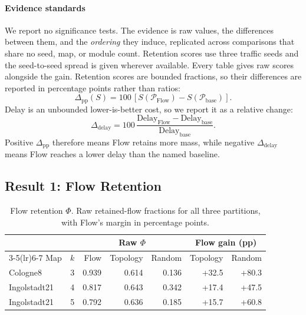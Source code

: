 \documentclass[journal]{IEEEtran}
\theoremstyle{definition}
\begin{document}
\paragraph{Evidence standards}
We report no significance tests. The evidence is raw values, the differences between them, and the \emph{ordering} they induce, replicated across comparisons that share no seed, map, or module count. Retention scores use three traffic seeds and the seed-to-seed spread is given wherever available. Every table gives raw scores alongside the gain. Retention scores are bounded fractions, so their differences are reported in percentage points rather than ratios:
\begin{equation}
    \Delta_{\mathrm{pp}}(S)
    =
    100\,[S(\mathcal{P}_{\mathrm{Flow}})
        -S(\mathcal{P}_{\mathrm{base}})] .
    \label{eq:gainpp}
\end{equation}
Delay is an unbounded lower-is-better cost, so we report it as a relative change:
\begin{equation}
    \Delta_{\mathrm{delay}}
    =
    100\,\frac{\mathrm{Delay}_{\mathrm{Flow}}
        -\mathrm{Delay}_{\mathrm{base}}}
    {\mathrm{Delay}_{\mathrm{base}}}.
    \label{eq:waitgain}
\end{equation}
Positive $\Delta_{\mathrm{pp}}$ therefore means Flow retains more mass, while negative $\Delta_{\mathrm{delay}}$ means Flow reaches a lower delay than the named baseline.

\subsection{Result 1: Flow Retention}
\label{sec:exp-phi}

\begin{table}[t]
    \centering
    \caption{Flow retention $\Phi$. Raw retained-flow fractions for all three
        partitions, with Flow's margin in percentage points.}
    \label{tab:phi}
    \footnotesize
    \begin{tabular}{lrrrrrr}
        \toprule
                     &     & \multicolumn{3}{c}{Raw $\Phi$} & \multicolumn{2}{c}{Flow gain (pp)}                              \\
        \cmidrule(lr){3-5}\cmidrule(lr){6-7}
        Map          & $k$ & Flow                           & Topology                           & Random & Topology & Random \\
        \midrule
        Cologne8     & 3   & 0.939                          & 0.614                              & 0.136  & +32.5    & +80.3  \\
        Ingolstadt21 & 4   & 0.817                          & 0.643                              & 0.342  & +17.4    & +47.5  \\
        Ingolstadt21 & 5   & 0.792                          & 0.636                              & 0.185  & +15.7    & +60.8  \\
        \bottomrule
    \end{tabular}
\end{table}
\end{document}
